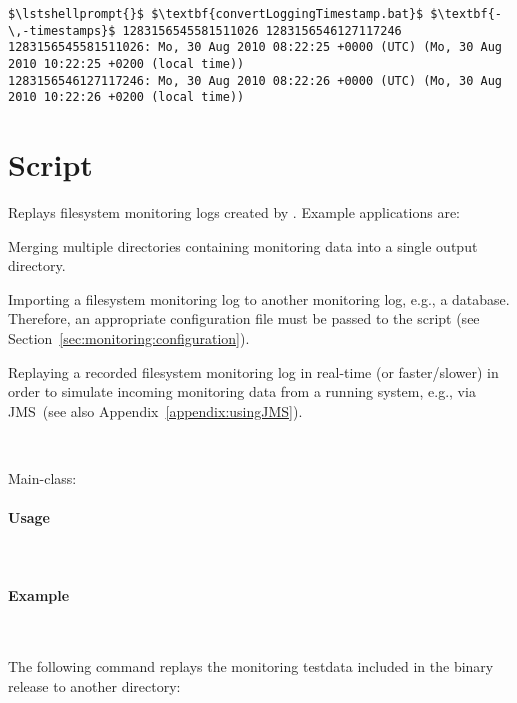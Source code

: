 \begin{lstlisting}[caption=Execution under Windows]
$\lstshellprompt{}$ $\textbf{convertLoggingTimestamp.bat}$ $\textbf{-\,-timestamps}$ 1283156545581511026 1283156546127117246 
1283156545581511026: Mo, 30 Aug 2010 08:22:25 +0000 (UTC) (Mo, 30 Aug 2010 10:22:25 +0200 (local time))
1283156546127117246: Mo, 30 Aug 2010 08:22:26 +0000 (UTC) (Mo, 30 Aug 2010 10:22:26 +0200 (local time))
\end{lstlisting}


\section{Script }

Replays filesystem monitoring logs created by \KiekerMonitoringPart{}. %
Example applications are:
\begin{compactitem}
\item Merging multiple directories containing monitoring data into a single %
output directory. 
\item Importing a filesystem monitoring log to another monitoring log, e.g., %
a database. Therefore, an appropriate \KiekerMonitoringPart{} configuration %
file must be passed to the script (see Section~\ref{sec:monitoring:configuration}).
\item Replaying a recorded filesystem monitoring log in real-time (or faster/slower) in order to simulate %
incoming monitoring data from a running system, e.g., via JMS~(see also Appendix~\ref{appendix:usingJMS}). 
\end{compactitem}

\

\noindent Main-class: {\small {}}

\paragraph*{Usage}\

\setTextListing


\paragraph*{Example}\

\noindent The following command replays the monitoring testdata included in %
the binary release to another directory:

